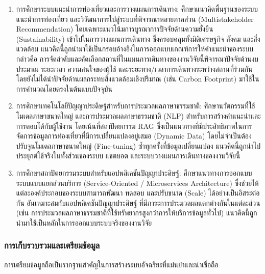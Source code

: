 \begingroup\listbreaksallowed
\begin{enumerate}
\item การศึกษาระบบแนะนำการท่องเที่ยวและการวางแผนการเดินทาง: ศึกษาแนวคิดพื้นฐานของระบบแนะนำการท่องเที่ยว และวิวัฒนาการไปสู่ระบบที่พิจารณาหลายภาคส่วน (Multistakeholder Recommendation) โดยเฉพาะแนวโน้มการบูรณาการปัจจัยด้านความยั่งยืน (Sustainability) เข้าไปในการวางแผนการเดินทาง ซึ่งครอบคลุมทั้งมิติเศรษฐกิจ สังคม และสิ่งแวดล้อม แนวคิดนี้ถูกนำมาใช้เป็นกรอบอ้างอิงในการออกแบบเกณฑ์การให้คำแนะนำของระบบ กล่าวคือ การจัดลำดับและคัดเลือกสถานที่ในแผนการเดินทางของงานวิจัยนี้พิจารณาปัจจัยด้านงบประมาณ ระยะเวลา ความสนใจของผู้ใช้ และระยะทาง/เวลาการเดินทางระหว่างสถานที่ร่วมกัน โดยยังไม่ได้นำปัจจัยด้านผลกระทบสิ่งแวดล้อมเชิงปริมาณ (เช่น Carbon Footprint) มาใช้ในการคำนวณโดยตรงในต้นแบบปัจจุบัน
\item การศึกษาเทคโนโลยีปัญญาประดิษฐ์สำหรับการประมวลผลภาษาธรรมชาติ: ศึกษานวัตกรรมที่ใช้โมเดลภาษาขนาดใหญ่ และการประมวลผลภาษาธรรมชาติ (NLP) สำหรับการสร้างคำแนะนำและการตอบโต้กับผู้ใช้งาน โดยเน้นที่สถาปัตยกรรม RAG ซึ่งเป็นแนวทางที่มีประสิทธิภาพในการจัดการข้อมูลการท่องเที่ยวที่มีการเปลี่ยนแปลงอยู่เสมอ (Dynamic Data) โดยไม่จำเป็นต้องปรับจูนโมเดลภาษาขนาดใหญ่ (Fine-tuning) ซ้ำทุกครั้งที่ข้อมูลเปลี่ยนแปลง แนวคิดนี้ถูกนำไปประยุกต์ใช้จริงในทั้งส่วนของระบบ แชตบอต และระบบวางแผนการเดินทางของงานวิจัยนี้
\item การศึกษาสถาปัตยกรรมระบบสำหรับแอปพลิเคชันปัญญาประดิษฐ์: ศึกษาแนวทางการออกแบบระบบแบบแยกส่วนบริการ (Service-Oriented / Microservices Architecture) ซึ่งช่วยให้แต่ละองค์ประกอบของระบบสามารถพัฒนา ทดสอบ และปรับขนาด (Scale) ได้อย่างเป็นอิสระต่อกัน อันเหมาะสมกับแอปพลิเคชันปัญญาประดิษฐ์ ที่มีภาระการประมวลผลแตกต่างกันในแต่ละส่วน (เช่น การประมวลผลภาษาธรรมชาติที่ใช้ทรัพยากรสูงกว่าการให้บริการข้อมูลทั่วไป) แนวคิดนี้ถูกนำมาใช้เป็นหลักในการออกแบบระบบจริงของงานวิจัย
\end{enumerate}
\endgroup

\subsubsection{การเก็บรวบรวมและเตรียมข้อมูล}

การเตรียมข้อมูลถือเป็นรากฐานสำคัญในการสร้างระบบอัจฉริยะที่แม่นยำและน่าเชื่อถือ

